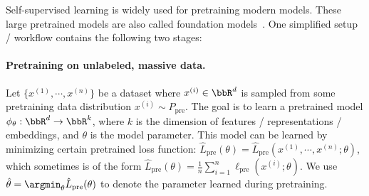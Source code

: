 


Self-supervised learning is widely used for pretraining modern models. These large pretrained models are also called foundation models~\cite{bommasani2021opportunities}. One simplified setup / workflow contains the following two stages:

\paragraph{Pretraining on unlabeled, massive data.} Let $\{x^{(1)}, \cdots, x^{(n)}\}$ be a dataset where $x^{(i)}\in\bbR^d$ is sampled from some pretraining data distribution $x^{(i)}\sim P_{\text{pre}}$. The goal is to learn a pretrained model $\phi_{\theta}: \bbR^d\rightarrow\bbR^k$, where $k$ is the dimension of features / representations / embeddings, and $\theta$ is the model parameter. This model can be learned by minimizing certain pretrained loss function: $\hat{L}_{\text{pre}}(\theta) = \hat{L}_{\text{pre}}(x^{(1)}, \cdots, x^{(n)}; \theta)$, which sometimes is of the form $\hat{L}_{\text{pre}}(\theta)  = \frac{1}{n}\sum_{i=1}^n \ell_{\text{pre}}(x^{(i)}; \theta)$. We use $\hat{\theta} = \argmin_{\theta}\hat{L}_{\text{pre}}(\theta)$ to denote the parameter learned during pretraining.

